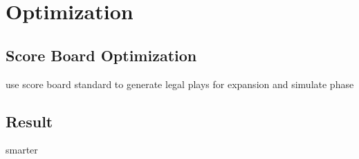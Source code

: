 
\section{Optimization}
\subsection{Score Board Optimization}
use score board standard to generate legal plays for expansion and simulate phase
\subsection{Result}
smarter
